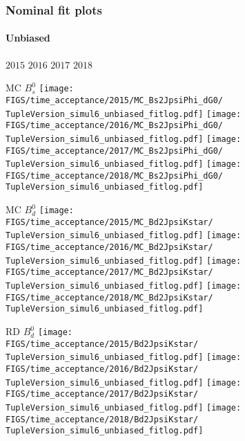 \begin{frame} %
\frametitle{Nominal fit plots}
\framesubtitle{Unbiased}

  \phantom{2020} \hspace*{1.5cm} $2015$ \hspace*{1.5cm} $2016$ \hspace*{1.5cm} $2017$ \hspace*{1.5cm} $2018$

  MC $B_s^0$
  \texttt{[image: \\FIGS/time\_acceptance/2015/MC\_Bs2JpsiPhi\_dG0/\\TupleVersion\_simul6\_unbiased\_fitlog.pdf]}
  \texttt{[image: \\FIGS/time\_acceptance/2016/MC\_Bs2JpsiPhi\_dG0/\\TupleVersion\_simul6\_unbiased\_fitlog.pdf]}
  \texttt{[image: \\FIGS/time\_acceptance/2017/MC\_Bs2JpsiPhi\_dG0/\\TupleVersion\_simul6\_unbiased\_fitlog.pdf]}
  \texttt{[image: \\FIGS/time\_acceptance/2018/MC\_Bs2JpsiPhi\_dG0/\\TupleVersion\_simul6\_unbiased\_fitlog.pdf]}
  \vspace*{2mm}

  MC $B_d^0$
  \texttt{[image: \\FIGS/time\_acceptance/2015/MC\_Bd2JpsiKstar/\\TupleVersion\_simul6\_unbiased\_fitlog.pdf]}
  \texttt{[image: \\FIGS/time\_acceptance/2016/MC\_Bd2JpsiKstar/\\TupleVersion\_simul6\_unbiased\_fitlog.pdf]}
  \texttt{[image: \\FIGS/time\_acceptance/2017/MC\_Bd2JpsiKstar/\\TupleVersion\_simul6\_unbiased\_fitlog.pdf]}
  \texttt{[image: \\FIGS/time\_acceptance/2018/MC\_Bd2JpsiKstar/\\TupleVersion\_simul6\_unbiased\_fitlog.pdf]}
  \vspace*{2mm}

  RD $B_d^0$
  \texttt{[image: \\FIGS/time\_acceptance/2015/Bd2JpsiKstar/\\TupleVersion\_simul6\_unbiased\_fitlog.pdf]}
  \texttt{[image: \\FIGS/time\_acceptance/2016/Bd2JpsiKstar/\\TupleVersion\_simul6\_unbiased\_fitlog.pdf]}
  \texttt{[image: \\FIGS/time\_acceptance/2017/Bd2JpsiKstar/\\TupleVersion\_simul6\_unbiased\_fitlog.pdf]}
  \texttt{[image: \\FIGS/time\_acceptance/2018/Bd2JpsiKstar/\\TupleVersion\_simul6\_unbiased\_fitlog.pdf]}

\end{frame} %




